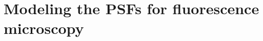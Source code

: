 \documentclass[reprint,aps,pra,superscriptaddress,
amsmath,amssymb]{revtex4-1}
\begin{document}




\section{Modeling the PSFs for fluorescence microscopy}
\end{document}
